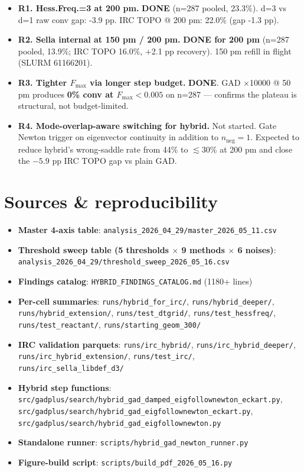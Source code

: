 \documentclass[11pt]{article}
\begin{document}
\begin{itemize}[leftmargin=1.5em, itemsep=0.1em]
\item \textbf{R1. Hess.Freq.=3 at 200 pm.} \textbf{DONE} (n=287 pooled, 23.3\%).
  d=3 vs d=1 raw conv gap: -3.9 pp. IRC TOPO @ 200 pm: 22.0\% (gap -1.3 pp).
\item \textbf{R2. Sella internal at 150 pm / 200 pm.} \textbf{DONE for 200 pm}
  (n=287 pooled, 13.9\%; IRC TOPO 16.0\%, +2.1 pp recovery). 150 pm refill
  in flight (SLURM 61166201).
\item \textbf{R3. Tighter $F_\mathrm{max}$ via longer step budget.} \textbf{DONE}.
  GAD ×10000 @ 50 pm produces \textbf{0\% conv at $F_\mathrm{max}<0.005$}
  on n=287 — confirms the plateau is structural, not budget-limited.
\item \textbf{R4. Mode-overlap-aware switching for hybrid.} Not started.
  Gate Newton trigger on eigenvector continuity in addition to
  $n_\mathrm{neg}{=}1$. Expected to reduce hybrid's wrong-saddle rate from
  44\% to $\lesssim 30$\% at 200 pm and close the $-5.9$ pp IRC TOPO gap vs
  plain GAD.
\end{itemize}

\section{Sources \& reproducibility}\label{sec:sources}

\begin{itemize}[leftmargin=1.5em, itemsep=0.05em]
\item \textbf{Master 4-axis table}: \texttt{analysis\_2026\_04\_29/master\_2026\_05\_11.csv}
\item \textbf{Threshold sweep table (5 thresholds $\times$ 9 methods $\times$ 6 noises)}: \texttt{analysis\_2026\_04\_29/threshold\_sweep\_2026\_05\_16.csv}
\item \textbf{Findings catalog}: \texttt{HYBRID\_FINDINGS\_CATALOG.md} (1180+ lines)
\item \textbf{Per-cell summaries}: \texttt{runs/hybrid\_for\_irc/}, \texttt{runs/hybrid\_deeper/}, \texttt{runs/hybrid\_extension/}, \texttt{runs/test\_dtgrid/}, \texttt{runs/test\_hessfreq/}, \texttt{runs/test\_reactant/}, \texttt{runs/starting\_geom\_300/}
\item \textbf{IRC validation parquets}: \texttt{runs/irc\_hybrid/}, \texttt{runs/irc\_hybrid\_deeper/}, \texttt{runs/irc\_hybrid\_extension/}, \texttt{runs/test\_irc/}, \texttt{runs/irc\_sella\_libdef\_d3/}
\item \textbf{Hybrid step functions}: \texttt{src/gadplus/search/hybrid\_gad\_damped\_eigfollownewton\_eckart.py}, \texttt{src/gadplus/search/hybrid\_gad\_eigfollownewton\_eckart.py}, \texttt{src/gadplus/search/hybrid\_gad\_eigfollownewton.py}
\item \textbf{Standalone runner}: \texttt{scripts/hybrid\_gad\_newton\_runner.py}
\item \textbf{Figure-build script}: \texttt{scripts/build\_pdf\_2026\_05\_16.py}
\end{itemize}
\end{document}
